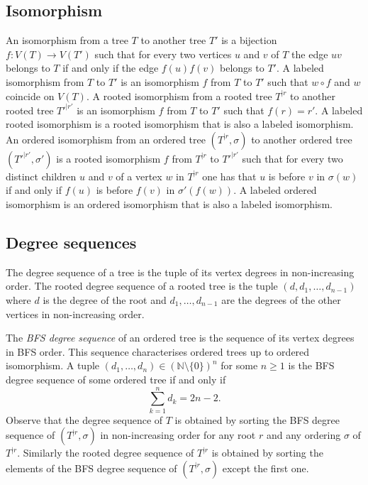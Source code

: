 \documentclass[11 pt]{modarticle}
\newcommand{\cN}{\mathbb{N}}
\newcommand{\wmap}{w}
\newcommand{\compose}{\mathbin{\circ}}
\newcommand{\vsetof}[1]{V(#1)}
\newcommand{\rtree}[2]{{#1}^{\lvert #2}}
\newcommand{\ortree}[3]{(\rtree{#1}{#2},{#3})}
\begin{document}
\subsection{Isomorphism}

An isomorphism from a tree $T$ to another tree $T'$ is a bijection $f\colon \vsetof{T} \to \vsetof{T'}$ such that for every two vertices $u$ and $v$ of $T$ the edge $uv$ belongs to $T$ if and only if the edge $f(u)f(v)$ belongs to $T'$. A labeled isomorphism from $T$ to $T'$ is an isomorphism $f$ from $T$ to $T'$ such that $\wmap \compose f$ and $\wmap$ coincide on $\vsetof{T}$. A rooted isomorphism from a rooted tree $\rtree{T}{r}$ to another rooted tree $\rtree{T'}{r'}$ is an isomorphism $f$ from $T$ to $T'$ such that $f(r) = r'$. A labeled rooted isomorphism is a rooted isomorphism that is also a labeled isomorphism. An ordered isomorphism from an ordered tree $\ortree{T}{r}{\sigma}$ to another ordered tree $\ortree{T'}{r'}{\sigma'}$ is a rooted isomorphism $f$ from $\rtree{T}{r}$ to $\rtree{T'}{r'}$ such that for every two distinct children $u$ and $v$ of a vertex $w$ in $\rtree{T}{r}$ one has that $u$ is before $v$ in $\sigma(w)$ if and only if $f(u)$ is before $f(v)$ in $\sigma'(f(w))$. A labeled ordered isomorphism is an ordered isomorphism that is also a labeled isomorphism.

\subsection{Degree sequences}

The degree sequence of a tree %
is the tuple %
of its vertex degrees in non-increasing order. The rooted degree sequence of a rooted tree is the tuple $(d, d_1, \dots, d_{n-1})$ where $d$ is the degree of the root and $d_1, \dots, d_{n-1}$ are the degrees of the other vertices  in non-increasing order.

The \emph{BFS degree sequence} of an ordered tree is the sequence of its vertex degrees in BFS order. This sequence characterises ordered trees up to ordered isomorphism. A tuple $(d_1, \dots, d_n) \in (\cN \setminus \{0\})^n$ for some $n \geq 1$ is the BFS degree sequence of some ordered tree if and only if
\begin{equation}
	\underset{k=1}{\overset{n}{\sum}} d_k = 2n - 2 \label{eq:valid-seq}.
\end{equation}
Observe that the degree sequence of $T$ is obtained by sorting the BFS degree sequence of $\ortree{T}{r}{\sigma}$ in non-increasing order for any root $r$ and any ordering $\sigma$ of $\rtree{T}{r}$. Similarly the rooted degree sequence of $\rtree{T}{r}$ is obtained by sorting the elements of the BFS degree sequence of $\ortree{T}{r}{\sigma}$ except the first one.
\end{document}
